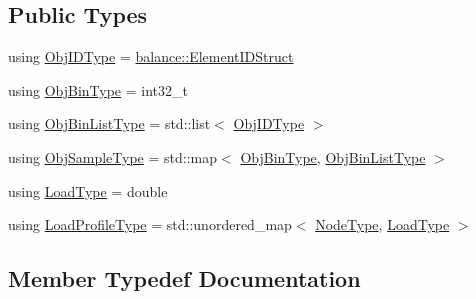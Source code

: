 \subsection*{Public Types}
\begin{DoxyCompactItemize}
\item 
using \hyperlink{structvt_1_1vrt_1_1collection_1_1lb_1_1_greedy_l_b_types_ae22670acd689e4ff83315fac2e4acb5e}{Obj\+I\+D\+Type} = \hyperlink{structvt_1_1vrt_1_1collection_1_1balance_1_1_element_i_d_struct}{balance\+::\+Element\+I\+D\+Struct}
\item 
using \hyperlink{structvt_1_1vrt_1_1collection_1_1lb_1_1_greedy_l_b_types_ae0dc433e9afe6112dd0a7ba402e0d6c2}{Obj\+Bin\+Type} = int32\+\_\+t
\item 
using \hyperlink{structvt_1_1vrt_1_1collection_1_1lb_1_1_greedy_l_b_types_a5f1f5da7ec80da0de64a9d91624c396b}{Obj\+Bin\+List\+Type} = std\+::list$<$ \hyperlink{structvt_1_1vrt_1_1collection_1_1lb_1_1_greedy_l_b_types_ae22670acd689e4ff83315fac2e4acb5e}{Obj\+I\+D\+Type} $>$
\item 
using \hyperlink{structvt_1_1vrt_1_1collection_1_1lb_1_1_greedy_l_b_types_a467f8a79d0785fca5fc95bd5c0f406b9}{Obj\+Sample\+Type} = std\+::map$<$ \hyperlink{structvt_1_1vrt_1_1collection_1_1lb_1_1_greedy_l_b_types_ae0dc433e9afe6112dd0a7ba402e0d6c2}{Obj\+Bin\+Type}, \hyperlink{structvt_1_1vrt_1_1collection_1_1lb_1_1_greedy_l_b_types_a5f1f5da7ec80da0de64a9d91624c396b}{Obj\+Bin\+List\+Type} $>$
\item 
using \hyperlink{structvt_1_1vrt_1_1collection_1_1lb_1_1_greedy_l_b_types_a9fe8829bc0c92e88ddf9d149233a54f4}{Load\+Type} = double
\item 
using \hyperlink{structvt_1_1vrt_1_1collection_1_1lb_1_1_greedy_l_b_types_a8af324cd88e83727178631e4d1478932}{Load\+Profile\+Type} = std\+::unordered\+\_\+map$<$ \hyperlink{namespacevt_a866da9d0efc19c0a1ce79e9e492f47e2}{Node\+Type}, \hyperlink{structvt_1_1vrt_1_1collection_1_1lb_1_1_greedy_l_b_types_a9fe8829bc0c92e88ddf9d149233a54f4}{Load\+Type} $>$
\end{DoxyCompactItemize}


\subsection{Member Typedef Documentation}
\mbox{\label{structvt_1_1vrt_1_1collection_1_1lb_1_1_greedy_l_b_types_a8af324cd88e83727178631e4d1478932}} 
